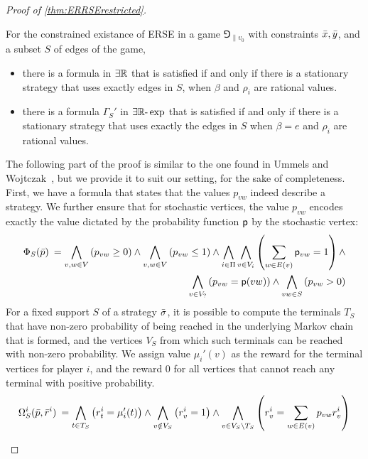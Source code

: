 \begin{proof}[Proof of \cref{thm:ERRSErestricted}]
     \begin{proposition}\label{prop:ETRformula}
        For the constrained existance of ERSE in a game $\Game_{\|v_0}$ with constraints $\Bar{x},\Bar{y}$, and a subset $S$ of edges of the game, 
         \begin{itemize}
             \item there is a formula  in $\exists\mathbb{R}$ that is satisfied if and only if there is a stationary strategy that uses exactly edges in $S$, when $\beta$ and $\rho_i$ are rational values.
             \item there is a formula $\Gamma_S'$ in $\exists\mathbb{R}\text{-}\exp$ that is satisfied if and only if there is a stationary strategy that uses exactly the edges in $S$ when $\beta = e$ and $\rho_i$ are rational values.
         \end{itemize}
    \end{proposition}
    \begin{claimproof}
    The following part of the proof is similar to the one found in Ummels and Wojtczak~\cite[Theorem 4.5]{UW11}, but we provide it to suit our setting, for the sake of completeness. 
    First, we have a formula that states that the values $p_{vw}$ indeed describe a strategy. We further ensure that for stochastic vertices, the value $p_{vw}$ encodes exactly the value dictated by the probability function $\mathsf{p}$ by the stochastic vertex:
    \begin{align*}
    \Phi_S(\Bar{p})\:= \bigwedge_{v,w\in V} \left( p_{vw}\geq 0\right)\land \bigwedge_{v,w\in V} \left( p_{vw} \leq 1\right)
    \land \bigwedge_{i\in \Pi}\bigwedge_{v\in V_i} \left( \sum_{w\in E(v)}\mathsf{p}_{vw}=1 \right)\land \\
    \bigwedge_{v\in V_?} \left( p_{vw} =  \mathsf{p}(vw)\right) \land \bigwedge_{vw\in S} \left(p_{vw}> 0 \right)
    \end{align*}
    For a fixed support $S$ of a strategy ${\bar{\sigma}}$, it is possible to compute the terminals $T_S$ that have non-zero probability of being reached in the underlying Markov chain that is formed, and the vertices $V_S$ from which such terminals can be reached with non-zero probability. We assign value $\mu_i'(v)$ as the reward for the terminal vertices for player $i$, and the reward $0$ for all vertices that cannot reach any terminal with positive probability. %
    \[\Omega_S^i(\Bar{p},\Bar{r}^i)\:= \bigwedge_{t\in T_S} \left(r^i_t =\mu_i'(t)\right) \land
                 \bigwedge_{v\notin V_S} \left( r^i_v = 1\right) \land
                 \bigwedge_{v\in V_S\setminus T_S} \left( r^i_v = \sum_{w\in E(v)}p_{vw} r^i_v \right)
\]
\end{claimproof}
\end{proof}
